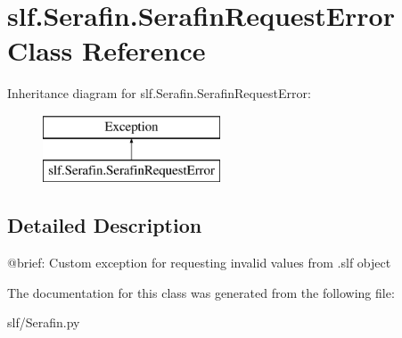 \hypertarget{classslf_1_1_serafin_1_1_serafin_request_error}{}\section{slf.\+Serafin.\+Serafin\+Request\+Error Class Reference}
\label{classslf_1_1_serafin_1_1_serafin_request_error}
Inheritance diagram for slf.\+Serafin.\+Serafin\+Request\+Error\+:\begin{figure}[H]
\begin{center}
\leavevmode
\includegraphics[height=2.000000cm]{classslf_1_1_serafin_1_1_serafin_request_error}
\end{center}
\end{figure}


\subsection{Detailed Description}
\begin{DoxyVerb}@brief: Custom exception for requesting invalid values from .slf object
\end{DoxyVerb}
 

The documentation for this class was generated from the following file\+:\begin{DoxyCompactItemize}
\item 
slf/Serafin.\+py\end{DoxyCompactItemize}
